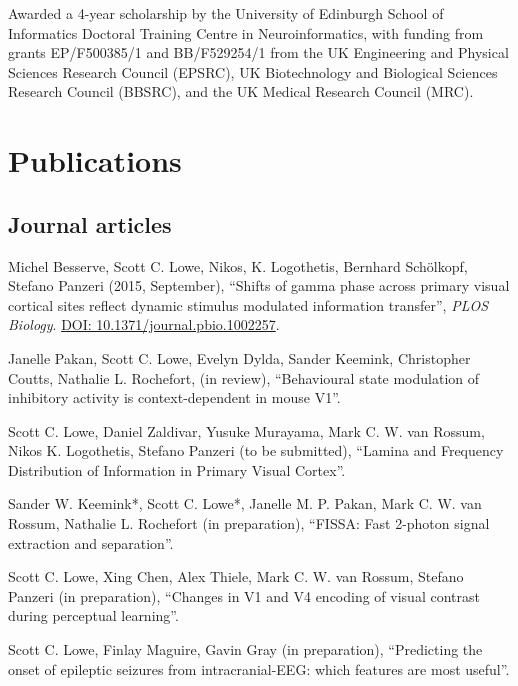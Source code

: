 \documentclass[11pt, a4paper]{article} %
\newcommand{\years}[1]{\marginnote{\scriptsize #1}} %
\renewenvironment{itemize}{
  \begin{list}{}{
    \setlength{\leftmargin}{0em}
  }
}{
  \end{list}
}
\begin{document}
\years{2011}Awarded a 4-year scholarship by the University of Edinburgh School of Informatics Doctoral Training Centre in Neuroinformatics,
with funding from grants EP/F500385/1 and  BB/F529254/1 from the UK Engineering and Physical Sciences Research Council (EPSRC), UK Biotechnology and Biological Sciences Research Council (BBSRC), and the UK Medical Research Council (MRC).
% 


\section*{Publications}
%
%
\subsection*{Journal articles}
%
\begin{itemize}
%
\item
Michel Besserve, Scott C. Lowe, Nikos, K. Logothetis, Bernhard Sch\"{o}lkopf, Stefano Panzeri (2015, September), ``Shifts of gamma phase across primary visual cortical sites reflect dynamic stimulus modulated information transfer'', \emph{PLOS Biology}. \href{https://doi.org/10.1371/journal.pbio.1002257}{DOI: 10.1371/journal.pbio.1002257}.
%
\item
Janelle Pakan, Scott C. Lowe, Evelyn Dylda, Sander Keemink, Christopher Coutts, Nathalie L. Rochefort, (in review), ``Behavioural state modulation of inhibitory activity is context-dependent in mouse V1''.
%
\item
Scott C. Lowe, Daniel Zaldivar, Yusuke Murayama, Mark C. W. van Rossum, Nikos K. Logothetis, Stefano Panzeri (to be submitted), ``Lamina and Frequency Distribution of Information in Primary Visual Cortex''.
%
\item
Sander W. Keemink*, Scott C. Lowe*, Janelle M. P. Pakan, Mark C. W. van Rossum, Nathalie L. Rochefort (in preparation), ``FISSA: Fast 2-photon signal extraction and separation''.
%
\item
Scott C. Lowe, Xing Chen, Alex Thiele, Mark C. W. van Rossum, Stefano Panzeri (in preparation), ``Changes in V1 and V4 encoding of visual contrast during perceptual learning''.
%
\item
Scott C. Lowe, Finlay Maguire, Gavin Gray (in preparation), ``Predicting the onset of epileptic seizures from intracranial-EEG: which features are most useful''.
%
\end{itemize}
%
%
\end{document}
